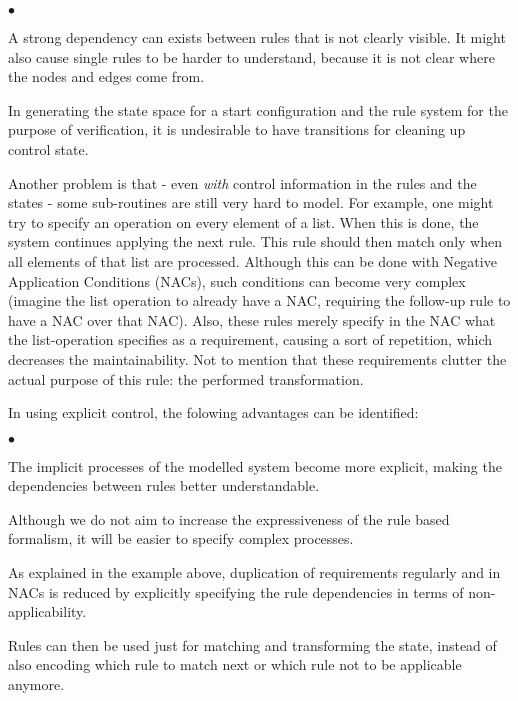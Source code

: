 \begin{list}{$\bullet$}{}
\item A strong dependency can exists between rules that is not clearly visible. It might also cause single rules to be harder to understand, because it is not clear where the nodes and edges come from.
\item In generating the state space for a start configuration and the rule system for the purpose of verification, it is undesirable to have transitions for cleaning up control state.
\end{list}

Another problem is that - even \emph{with} control information in the rules and the states - some sub-routines are still very hard to model. For example, one might try to specify an operation on every element of a list. When this is done, the system continues applying the next rule. This rule should then match only when all elements of that list are processed. Although this can be done with Negative Application Conditions (NACs), such conditions can become very complex (imagine the list operation to already have a NAC, requiring the follow-up rule to have a NAC over that NAC). Also, these rules merely specify in the NAC what the list-operation specifies as a requirement, causing a sort of repetition, which decreases the maintainability. Not to mention that these requirements clutter the actual purpose of this rule: the performed transformation.

In using explicit control, the folowing advantages can be identified:

\begin{list}{$\bullet$}{}
\item The implicit processes of the modelled system become more explicit, making the dependencies between rules better understandable. 
\item Although we do not aim to increase the expressiveness of the rule based formalism, it will be easier to specify complex processes.
\item As explained in the example above, duplication of requirements regularly and in NACs is reduced by explicitly specifying the rule dependencies in terms of non-applicability.
\item Rules can then be used just for matching and transforming the state, instead of also encoding which rule to match next or which rule not to be applicable anymore.
\end{list}

\fi %

